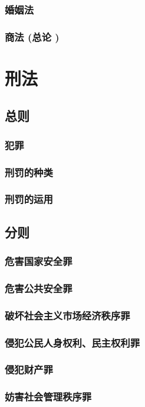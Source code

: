 \documentclass[UTF8]{../ApplicationUniverse}
\begin{document}
    \subsubsection{婚姻法}
    \subsubsection{商法 (总论 )}

\section{刑法}
    \subsection{总则}
        \subsubsection{犯罪}
        \subsubsection{刑罚的种类}
        \subsubsection{刑罚的运用}
    \subsection{分则}
        \subsubsection{危害国家安全罪}
        \subsubsection{危害公共安全罪}
        \subsubsection{破坏社会主义市场经济秩序罪}
        \subsubsection{侵犯公民人身权利、民主权利罪}
        \subsubsection{侵犯财产罪}
        \subsubsection{妨害社会管理秩序罪}
\end{document}

